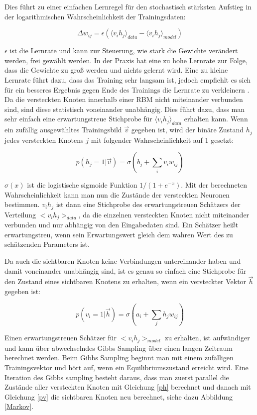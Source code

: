 \documentclass[12pt]{article}
\begin{document}
 Dies führt zu einer einfachen Lernregel für den stochastisch stärksten Aufstieg in der logarithmischen Wahrscheinlichkeit der Trainingsdaten:

\begin{equation}
\Delta w_{ij} = \epsilon\left( \langle v_i h_j \rangle_{data} - \langle v_i h_j \rangle_{model} \right)
\end{equation}

$\epsilon$ ist die Lernrate und kann zur Steuerung, wie stark die Gewichte verändert werden, frei gewählt werden. In der Praxis hat eine zu hohe Lernrate zur Folge, dass die Gewichte zu groß werden und nichts gelernt wird. Eine zu kleine Lernrate führt dazu, dass das Training sehr langsam ist, jedoch empfiehlt es sich für ein besseres Ergebnis gegen Ende des Trainings die Lernrate zu verkleinern \cite{guide}. Da die versteckten Knoten innerhalb einer RBM nicht miteinander verbunden sind, sind diese statistisch voneinander unabhängig. Dies führt dazu, dass man sehr einfach eine erwartungstreue Stichprobe für $\langle v_i h_j \rangle_{data}$ erhalten kann. Wenn ein zufällig ausgewähltes Trainingsbild $\vec{v}$ gegeben ist, wird der binäre Zustand $h_j$ jedes versteckten Knotens $j$ mit folgender Wahrscheinlichkeit auf 1 gesetzt:

\begin{equation}
p(h_j = 1 | \vec{v}) = \sigma (b_j + \sum_{i} v_i w_{ij})
\label{ph}
\end{equation}

$\sigma(x)$ ist die logistische sigmoide Funktion $1/(1+e^{-x})$.  Mit der berechneten Wahrscheinlichkeit kann man nun die Zustände der versteckten Neuronen bestimmen. $v_ih_j$ ist dann eine Stichprobe des erwartungstreuen Schätzers der Verteilung $<v_i h_j>_{data}$, da die einzelnen versteckten Knoten nicht miteinander verbunden und nur abhängig von den Eingabedaten sind. Ein Schätzer heißt erwartungstreu, wenn sein Erwartungswert gleich dem wahren Wert des zu schätzenden Parameters ist.

Da auch die sichtbaren Knoten keine Verbindungen untereinander haben und damit voneinander unabhängig sind, ist es genau so einfach eine Stichprobe für den Zustand eines sichtbaren Knotens zu erhalten, wenn ein versteckter Vektor $\vec{h}$ gegeben ist:

\begin{equation}
p(v_i =1 | \vec{h}) = \sigma (a_i + \sum_{j} h_j w_{ij})
\label{pv}
\end{equation}

Einen erwartungstreuen Schätzer für $<v_i h_j>_{model}$ zu erhalten, ist aufwändiger und kann über abwechselndes Gibbs Sampling über einen langen Zeitraum berechnet werden. Beim Gibbs Sampling beginnt man mit einem zufälligen Trainingsvektor und hört auf, wenn ein Equilibriumszustand erreicht wird. Eine Iteration des Gibbs sampling besteht daraus, dass man zuerst parallel die Zustände aller versteckten Knoten mit Gleichung \ref{ph} berechnet und danach mit Gleichung \ref{pv} die sichtbaren Knoten neu berechnet, siehe dazu Abbildung \ref{Markov}.
\end{document}
